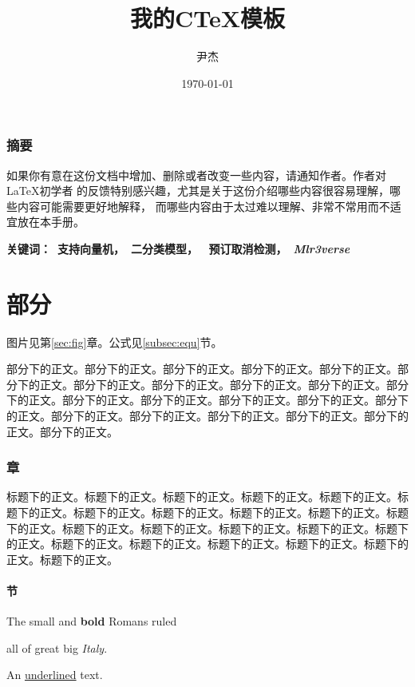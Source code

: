 \documentclass{ctexart}
\title{我的CTeX模板}
\author{尹杰}
\date{\today}
\theoremstyle{plain} 		     %
\theoremstyle{definition} 		 %
\theoremstyle{remark} 			 %
\begin{document}
\maketitle %

\section*{摘要}
如果你有意在这份文档中增加、删除或者改变一些内容，请通知作者。作者对\LaTeX 初学者
的反馈特别感兴趣，尤其是关于这份介绍哪些内容很容易理解，哪些内容可能需要更好地解释，
而哪些内容由于太过难以理解、非常不常用而不适宜放在本手册。
\vspace{0.5ex} %

{\heiti \bfseries {\large 关键词：}\ 支持向量机，\ 二分类模型，
		\  预订取消检测，\ \itshape Mlr3verse}

\newpage		 %
\tableofcontents %

\newpage		 %

\part{部分}
图片见第\ref{sec:fig}章。公式见\ref{subsec:equ}节。

部分下的正文。部分下的正文。部分下的正文。部分下的正文。部分下的正文。部分下的正文。部分下的正文。部分下的正文。部分下的正文。部分下的正文。部分下的正文。部分下的正文。部分下的正文。部分下的正文。部分下的正文。部分下的正文。部分下的正文。部分下的正文。部分下的正文。部分下的正文。部分下的正文。部分下的正文。

\section{章}
标题下的正文。标题下的正文。标题下的正文。标题下的正文。标题下的正文。标题下的正文。标题下的正文。标题下的正文。标题下的正文。标题下的正文。标题下的正文。标题下的正文。标题下的正文。标题下的正文。标题下的正文。标题下的正文。标题下的正文。标题下的正文。标题下的正文。标题下的正文。标题下的正文。标题下的正文。

\subsection{节}
{\small The small and
	\textbf{bold} Romans ruled} %

{\large all of great big
	{\itshape Italy}.} %

An \underline{underlined} text.
\end{document}
